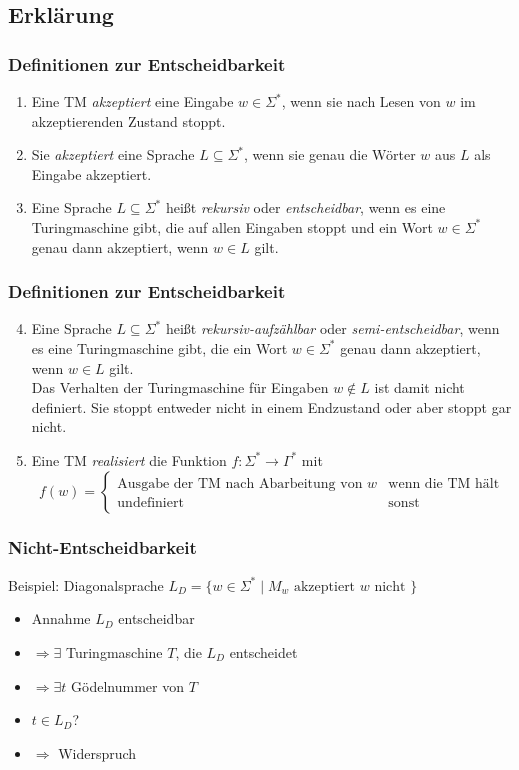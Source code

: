 \subsection{Erklärung}
\begin{frame}
	\frametitle{Definitionen zur Entscheidbarkeit}
	 \begin{enumerate}
  \item Eine TM \emph{akzeptiert} eine Eingabe $w \in \Sigma^*$, wenn sie nach Lesen von $w$ im akzeptierenden Zustand stoppt.
  \item Sie \emph{akzeptiert} eine Sprache $L \subseteq \Sigma^*$, wenn sie genau die Wörter $w$ aus $L$ als Eingabe akzeptiert.
  \item Eine Sprache $L \subseteq \Sigma^*$ heißt \emph{rekursiv} oder \emph{entscheidbar}, wenn es eine Turingmaschine gibt, die auf allen Eingaben stoppt und
	ein Wort $w \in \Sigma^*$ genau dann akzeptiert, wenn $w \in L$ gilt.
\end{enumerate}
\end{frame}
\begin{frame}
	\frametitle{Definitionen zur Entscheidbarkeit}
 \begin{enumerate}
 \setcounter{enumi}{3}
  \item Eine Sprache $L \subseteq \Sigma^*$ heißt \emph{rekursiv-aufzählbar} oder \emph{semi-entscheidbar}, wenn es eine Turingmaschine gibt, die ein Wort $w \in \Sigma^*$ genau dann akzeptiert, wenn $w \in L$ gilt. \\ Das Verhalten der Turingmaschine für Eingaben $w \not\in L$ ist damit nicht definiert.
	Sie stoppt entweder nicht in einem Endzustand oder aber stoppt gar nicht.
	\item Eine TM \emph{realisiert} die Funktion $f: \Sigma^* \rightarrow \Gamma^*$ mit $$f(w) = \begin{cases} \text{Ausgabe der TM nach Abarbeitung von } w & \text{wenn die TM hält} \\ \text{undefiniert} & \text{sonst} \end{cases}$$
 \end{enumerate}
\end{frame}

\begin{frame}
	\frametitle{Nicht-Entscheidbarkeit}
	Beispiel: Diagonalsprache
	$L_D = \{ w \in \Sigma^* \mid M_w \text{ akzeptiert } w \text{ nicht }\} $
	\begin{itemize}
		\item Annahme $L_D$ entscheidbar
		\item $\Rightarrow \exists$ Turingmaschine $T$, die $L_D$ entscheidet
		\item $\Rightarrow \exists t$ Gödelnummer von $T$
		\item $t \in L_D$?
		\item $\Rightarrow$ Widerspruch 
	\end{itemize}
\end{frame}

